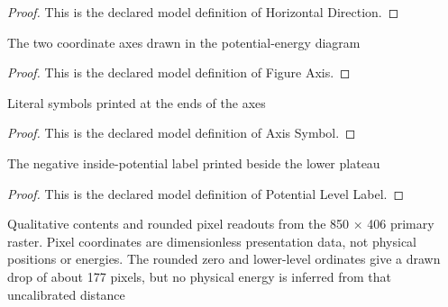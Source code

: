 \begin{proof}
  This is the declared model definition of Horizontal Direction.
\end{proof}
\begin{definition}
  \label{def:physics:phyx-mini-0600:phyxminiproblems-problemphyxmini0600-figureaxis}
  The two coordinate axes drawn in the potential-energy diagram
\end{definition}
\begin{proof}
  This is the declared model definition of Figure Axis.
\end{proof}
\begin{definition}
  \label{def:physics:phyx-mini-0600:phyxminiproblems-problemphyxmini0600-axissymbol}
  Literal symbols printed at the ends of the axes
\end{definition}
\begin{proof}
  This is the declared model definition of Axis Symbol.
\end{proof}
\begin{definition}
  \label{def:physics:phyx-mini-0600:phyxminiproblems-problemphyxmini0600-potentiallevellabel}
  The negative inside-potential label printed beside the lower plateau
\end{definition}
\begin{proof}
  This is the declared model definition of Potential Level Label.
\end{proof}
\begin{definition}
  \label{def:physics:phyx-mini-0600:phyxminiproblems-problemphyxmini0600-abruptpotentialdropfigure}
  Qualitative contents and rounded pixel readouts from the 850 × 406 primary raster. Pixel coordinates are dimensionless presentation data, not physical positions or energies. The rounded zero and lower-level ordinates give a drawn drop of about 177 pixels, but no physical energy is inferred from that uncalibrated distance
\end{definition}
